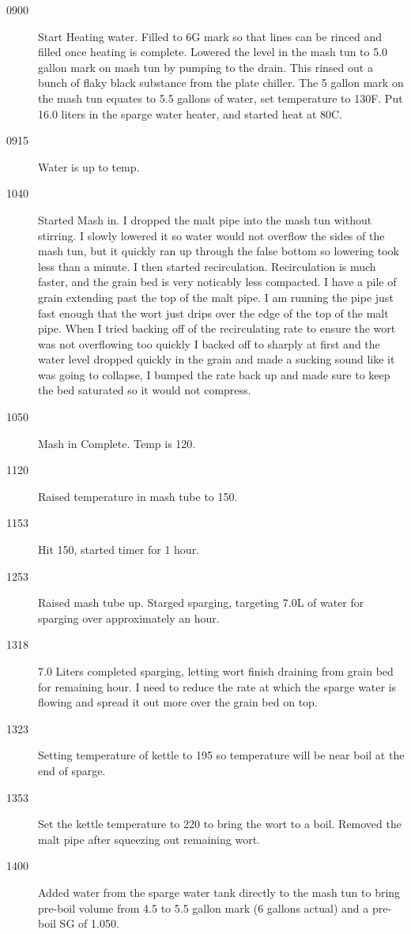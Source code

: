 \begin{description}
    \item[0900] Start Heating water.  Filled to 6G mark so that lines can be rinced and filled once heating is complete. Lowered the level in the mash tun to 5.0 gallon mark on mash tun by pumping to the drain.  This rinsed out a bunch of flaky black substance from the plate chiller.  The 5 gallon mark on the mash tun equates to 5.5 gallons of water, set temperature to 130F.  Put 16.0 liters in the sparge water heater, and started heat at 80C.  
    \item[0915] Water is up to temp.
    \item[1040] Started Mash in.  I dropped the malt pipe into the mash tun without stirring.  I slowly lowered it so water would not overflow the sides of the mash tun, but it quickly ran up through the false bottom so lowering took less than a minute.  I then started recirculation.  Recirculation is much faster, and the grain bed is very noticably less compacted.  I have a pile of grain extending past the top of the malt pipe.  I am running the pipe just fast enough that the wort just drips over the edge of the top of the malt pipe.  When I tried backing off of the recirculating rate to ensure the wort was not overflowing too quickly I backed off to sharply at first and the water level dropped quickly in the grain and made a sucking sound like it was going to collapse, I bumped the rate back up and made sure to keep the bed saturated so it would not compress.
    \item[1050] Mash in Complete. Temp is 120.
    \item[1120] Raised temperature in mash tube to 150.
    \item[1153] Hit 150, started timer for 1 hour.
    \item[1253] Raised mash tube up. Starged sparging, targeting 7.0L of water for sparging over approximately an hour.  
    \item[1318] 7.0 Liters completed sparging, letting wort finish draining from grain bed for remaining hour.  I need to reduce the rate at which the sparge water is flowing and spread it out more over the grain bed on top.
    \item[1323] Setting temperature of kettle to 195 so temperature will be near boil at the end of sparge.
    \item[1353] Set the kettle temperature to 220 to bring the wort to a boil.  Removed the malt pipe after squeezing out remaining wort.
    \item[1400] Added water from the sparge water tank directly to the mash tun to bring pre-boil volume from 4.5 to 5.5 gallon mark (6 gallons actual) and a pre-boil SG of 1.050.

\end{description}
